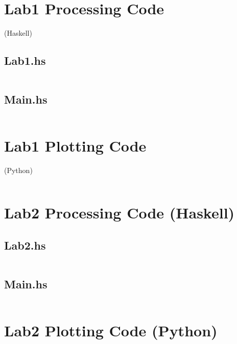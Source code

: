 \documentclass[a4paper]{article}
\begin{document}
\newpage

\appendix

\section{Lab1 Processing Code} (Haskell)

\subsection{Lab1.hs}
\inputminted{haskell}{../src/AI/Lab1/Lab1.hs}

\subsection{Main.hs}
\inputminted{haskell}{../src/AI/Lab1/Main.hs}

\section{Lab1 Plotting Code} (Python)
\inputminted{python}{../src/AI/Lab1/plotting.py}


\section{Lab2 Processing Code (Haskell)}

\subsection{Lab2.hs}
\inputminted{haskell}{../src/AI/Lab2/Lab2.hs}

\subsection{Main.hs}
\inputminted{haskell}{../src/AI/Lab2/Main.hs}


\section{Lab2 Plotting Code (Python)}
\inputminted{python}{../src/AI/Lab2/plotting.py}
\end{document}
